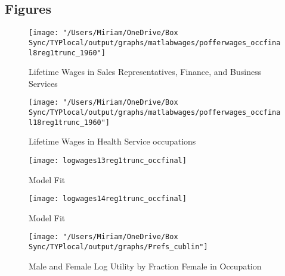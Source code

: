 \documentclass[12pt]{article}
\begin{document}
\subsection{Figures}



\begin{figure}[H]
\centering
\caption{Lifetime Wages in Sales Representatives, Finance, and Business Services}
\label{sales}
\texttt{[image: "/Users/Miriam/OneDrive/Box Sync/TYPlocal/output/graphs/matlabwages/pofferwages\_occfinal8reg1trunc\_1960"]}
\end{figure}

\begin{figure}[H]
\centering
\caption{Lifetime Wages in Health Service occupations}
\label{health}
\texttt{[image: "/Users/Miriam/OneDrive/Box Sync/TYPlocal/output/graphs/matlabwages/pofferwages\_occfinal18reg1trunc\_1960"]}
\end{figure}

\begin{figure}[H]
\centering
\caption{Model Fit}
\label{fig:modelwages1}
\texttt{[image: logwages13reg1trunc\_occfinal]}
\end{figure}

\begin{figure}[H]
\centering
\caption{Model Fit}
\label{fig:modelwages2}
\texttt{[image: logwages14reg1trunc\_occfinal]}
\end{figure}

\begin{figure}[H]
\caption{Male and Female Log Utility by Fraction Female in Occupation}
\label{prefs}
\begin{center}
\texttt{[image: "/Users/Miriam/OneDrive/Box Sync/TYPlocal/output/graphs/Prefs\_cublin"]}
\end{center}
\end{figure}
\end{document}
